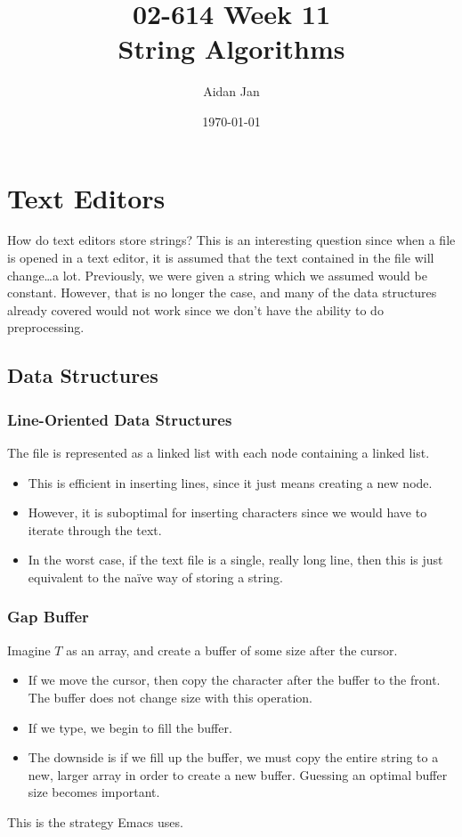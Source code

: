 \documentclass[10pt]{article}
\title{02-614 Week 11 \\ \large{String Algorithms}}
\author{Aidan Jan}
\date{\today}
\begin{document}
\maketitle
\section*{Text Editors}
How do text editors store strings?  This is an interesting question since when a file is opened in a text editor, it is assumed that the text contained in the file will change\dots a lot.  Previously, we were given a string which we assumed would be constant.  However, that is no longer the case, and many of the data structures already covered would not work since we don't have the ability to do preprocessing.

\subsection*{Data Structures}
\subsubsection*{Line-Oriented Data Structures}
The file is represented as a linked list with each node containing a linked list. 
\begin{itemize}
    \item This is efficient in inserting lines, since it just means creating a new node.
    \item However, it is suboptimal for inserting characters since we would have to iterate through the text.
    \item In the worst case, if the text file is a single, really long line, then this is just equivalent to the na\"ive way of storing a string.
\end{itemize}

\subsubsection*{Gap Buffer}
Imagine $T$ as an array, and create a buffer of some size after the cursor.
\begin{itemize}
    \item If we move the cursor, then copy the character after the buffer to the front.  The buffer does not change size with this operation.
    \item If we type, we begin to fill the buffer.
    \item The downside is if we fill up the buffer, we must copy the entire string to a new, larger array in order to create a new buffer.  Guessing an optimal buffer size becomes important.
\end{itemize}
This is the strategy Emacs uses.
\end{document}

